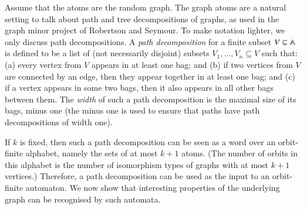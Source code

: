    
   \begin{myexample}
	Assume that the atoms are the random graph.  The graph atoms are a natural setting to talk about path and tree decompositions of graphs, as used in the graph minor project of Robertson and Seymour. To make notation lighter, we only discuss path decompositions. 
	 A \emph{path decomposition} for a finite subset $V \subseteq \mathbb A$ is defined to be a list of (not necessarily disjoint) subsets $V_1,\ldots,V_n \subseteq V$ such that: (a) every vertex from $V$ appears in at least one bag; and (b) if two vertices from $V$ are connected by an edge, then they appear together in  at least one bag; and (c) if a vertex appears in some two bags, then it also appears in all other bags between them. The \emph{width} of such a path decomposition is the maximal size of its bags, minus one (the minus one is used to ensure that paths have path decompositions of width one). 

	 If $k$ is fixed, then  such a path decomposition can be seen as a word over an orbit-finite alphabet, namely the sets of at most $k+1$ atoms. (The number of orbits in this alphabet is the number of isomorphism types of graphs with at most $k+1$ vertices.)  Therefore, a path decomposition  can be used as the input to an orbit-finite automaton. 
	 We now show that interesting properties of the underlying graph can be recognised by such automata. 
	

\end{myexample}
